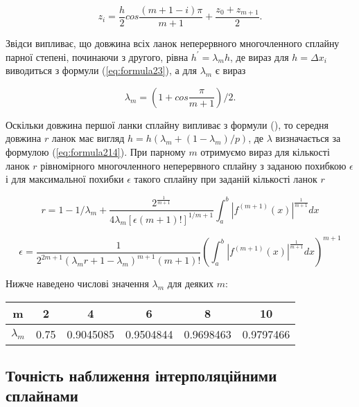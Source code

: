 \documentclass[ukrainian,14pt]{extarticle}
\begin{document}
$$z_i = \frac{h}{2} cos \frac{(m+1-i)\pi}{m+1} + \frac{z_0 + z_{m+1}}{2}.$$

Звідси випливає, що довжина всіх ланок неперервного многочленного сплайну парної степені, починаючи з другого, рівна $h^' = \lambda_m h$, де вираз для $h = \Delta x_i$ виводиться з формули (\ref{eq:formula23}), а для $\lambda_m$ є вираз

\begin{equation}\label{eq:formula214}
\lambda_m = \left(1 + cos\frac{\pi}{m+1}\right) / 2.
\end{equation}


Оскільки довжина першої ланки сплайну випливає з формули (\label{eq:formula23}), то середня довжина $r$ ланок має вигляд $h = h(\lambda_m + (1 - \lambda_m) / p)$, де $\lambda$ визначається за формулою (\ref{eq:formula214}). При парному $m$ отримуємо вираз для кількості ланок $r$ рівномірного многочленного неперервного сплайну з заданою похибкою $\epsilon$ і для максимальної похибки $\epsilon$ такого сплайну при заданій кількості ланок $r$

\begin{equation}\label{eq:formula215}
r = 1 - 1/ \lambda_m + \frac{2^{\frac{1}{m+1}}}{4 \lambda_m [\epsilon(m+1)!]^{1/m+1}} \int_a^b |f^{(m+1)}(x)|^{\frac{1}{m+1}} dx
\end{equation}

\begin{equation}\label{eq:formula216}
\epsilon = \frac{1}{2^{2m+1} (\lambda_m r + 1 - \lambda_m)^{m+1}(m+1)!} \left(\int_a^b|f^{(m+1)}(x)|^{\frac{1}{m+1}} dx \right)^{m+1}
\end{equation}

Нижче наведено числові значення $\lambda_m$ для деяких $m$:

\bgroup
\def\arraystretch{1.5}
\begin{center}
\begin{tabular}{ c | c |
c | c | c | c}
 m & 2 & 4 & 6 & 8 & 10 \\
 \hline
 $\lambda_m$ & 0.75 & 0.9045085 & 0.9504844 & 0.9698463 & 0.9797466 \\  

\end{tabular}
\end{center}
\egroup

\subsection{Точність наближення інтерполяційними сплайнами}
\end{document}
